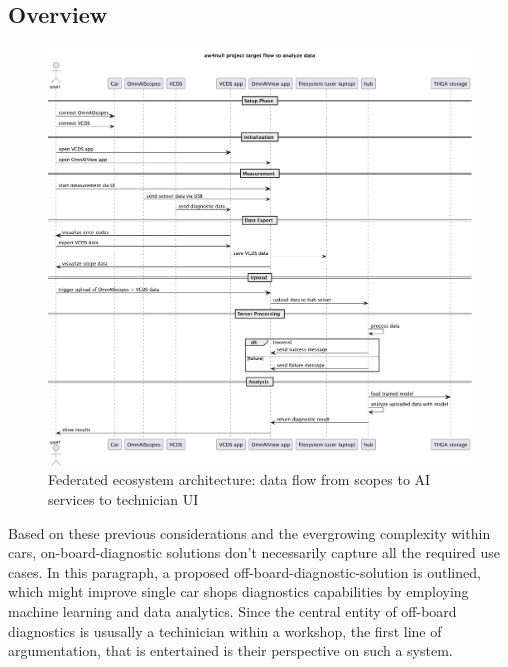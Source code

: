 \subsection{Overview}
\begin{figure}[t]
  \centering
  \includegraphics[width=\textwidth]{figures/aw4null_project_target_flow_to_analyze_data.pdf}
  \caption{Federated ecosystem architecture: data flow from scopes to AI services to technician UI}
  \label{fig:system_architecture}
\end{figure}
Based on these previous considerations and the evergrowing complexity within cars, on-board-diagnostic solutions don't necessarily capture all the required use cases.
In this paragraph, a proposed off-board-diagnostic-solution is outlined, which might improve single car shops diagnostics capabilities by employing machine learning and data analytics.
Since the central entity of off-board diagnostics is ususally a techinician within a workshop, the first line of argumentation, that is entertained is their perspective on such a system.

